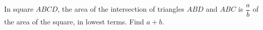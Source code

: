 In square $ABCD$, the area of the intersection of triangles $ABD$ and $ABC$ is $\dfrac{a}{b}$ of the area of the square, in lowest terms. Find $a+b$.

